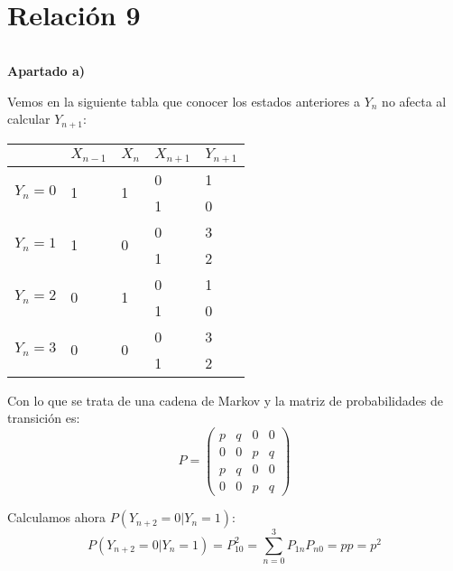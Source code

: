 \documentclass[openany]{book}
\begin{document}
\chapter{Relación 9}


\begin{exercise}
    $  $
    \begin{flushright}
        \textbf{Apartado a)}
    \end{flushright}
    Vemos en la siguiente tabla que conocer los estados anteriores a $ Y_n $ no afecta al calcular $ Y_{n+1} $:

 
    \begin{tabular}{l|l|l|l|l}
                              & $X_{n-1} $        &$ X_n    $           & $X_{n+1}$ &$Y_{n+1}$ \\ \hline
    \multicolumn{1}{c|}{\multirow{2}{*}{$Y_n = 0$}} & \multirow{2}{*}{1} & \multirow{2}{*}{1} & 0 & 1 \\
    \multicolumn{1}{c|}{}     &                    &                    & 1          & 0          \\ \hline
    \multirow{2}{*}{$Y_n = 1$} & \multirow{2}{*}{1} & \multirow{2}{*}{0} & 0          & 3          \\
                              &                    &                    & 1          & 2          \\ \hline
    \multirow{2}{*}{$Y_n=2$}   & \multirow{2}{*}{0} & \multirow{2}{*}{1} & 0          & 1          \\
                              &                    &                    & 1          & 0          \\ \hline
    \multirow{2}{*}{$Y_n=3$}   & \multirow{2}{*}{0} & \multirow{2}{*}{0} & 0          & 3          \\
                              &                    &                    & 1          & 2         
    \end{tabular}

    Con lo que se trata de una cadena de Markov y la matriz de probabilidades de transición es:
    $$ P = \begin{pmatrix} p & q & 0 & 0 \\ 0 & 0 & p & q \\ p & q & 0 & 0\\0 & 0 & p & q \end{pmatrix}  $$

    Calculamos ahora $ P(Y_{n+2}=0|Y_n=1)$:
    $$P(Y_{n+2}=0|Y_n=1) = P_10^2 = \sum\limits_{n=0}^{3}P_{1n}P_{n0} = pp = p^2 $$


\end{exercise}
\end{document}
